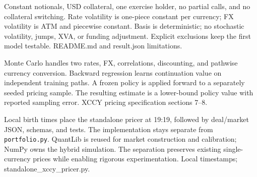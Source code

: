 {Constant notionals, USD collateral, one exercise holder, no partial calls, and no collateral switching.}
{Rate volatility is one-piece constant per currency; FX volatility is ATM and piecewise constant.}
{Basis is deterministic; no stochastic volatility, jumps, XVA, or funding adjustment.}
{Explicit exclusions keep the first model testable.}
{README.md and result.json limitations.}

{Monte Carlo handles two rates, FX, correlations, discounting, and pathwise currency conversion.}
{Backward regression learns continuation value on independent training paths.}
{A frozen policy is applied forward to a separately seeded pricing sample.}
{The resulting estimate is a lower-bound policy value with reported sampling error.}
{XCCY pricing specification sections 7--8.}

{Local birth times place the standalone pricer at 19:19, followed by deal/market JSON, schemas, and tests.}
{The implementation stays separate from \texttt{portfolio.py}.}
{QuantLib is reused for market construction and calibration; NumPy owns the hybrid simulation.}
{The separation preserves existing single-currency prices while enabling rigorous experimentation.}
{Local timestamps; standalone\_xccy\_pricer.py.}
